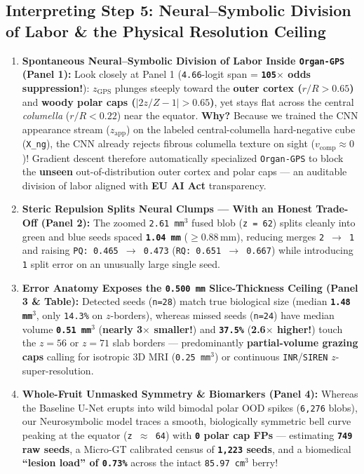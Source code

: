 \documentclass[10pt,a4paper]{article}
\begin{document}
\subsection*{Interpreting Step 5: Neural--Symbolic Division of Labor \& the Physical Resolution Ceiling}
\begin{enumerate}
    \item \textbf{Spontaneous Neural--Symbolic Division of Labor Inside \texttt{Organ-GPS} (Panel 1):} Look closely at Panel 1 (\texttt{4.66}-logit span = \textbf{\texttt{105$\times$} odds suppression!}): $z_{\text{GPS}}$ plunges steeply toward the \textbf{outer cortex ($r/R > 0.65$)} and \textbf{woody polar caps ($|2z/Z - 1| > 0.65$)}, yet stays flat across the central \textit{columella} ($r/R < 0.22$) near the equator. \textbf{Why?} Because we trained the CNN appearance stream ($z_{\text{app}}$) on the labeled central-columella hard-negative cube (\texttt{X\_ng}), the CNN already rejects fibrous columella texture on sight ($v_{\text{comp}} \approx 0$)! Gradient descent therefore automatically specialized \texttt{Organ-GPS} to block the \textbf{unseen} out-of-distribution outer cortex and polar caps --- an auditable division of labor aligned with \textbf{EU AI Act} transparency.
    \item \textbf{Steric Repulsion Splits Neural Clumps --- With an Honest Trade-Off (Panel 2):} The zoomed \texttt{2.61\,mm$^3$} fused blob (\texttt{z = 62}) splits cleanly into green and blue seeds spaced \textbf{\texttt{1.04\,mm}} ($\ge 0.88\,\text{mm}$), reducing merges \texttt{2 $\to$ 1} and raising \texttt{PQ: 0.465 $\to$ 0.473} (\texttt{RQ: 0.651 $\to$ 0.667}) while introducing \texttt{1} split error on an unusually large single seed.
    \item \textbf{Error Anatomy Exposes the \texttt{0.500\,mm} Slice-Thickness Ceiling (Panel 3 \& Table):} Detected seeds (\texttt{n=28}) match true biological size (median \textbf{\texttt{1.48\,mm$^3$}}, only \texttt{14.3\%} on $z$-borders), whereas missed seeds (\texttt{n=24}) have median volume \textbf{\texttt{0.51\,mm$^3$}} (\textbf{nearly 3$\times$ smaller!}) and \textbf{\texttt{37.5\%}} (\textbf{2.6$\times$ higher!}) touch the $z=56$ or $z=71$ slab borders --- predominantly \textbf{partial-volume grazing caps} calling for isotropic 3D MRI (\texttt{0.25\,mm$^3$}) or continuous \texttt{INR}/\texttt{SIREN} $z$-super-resolution.
    \item \textbf{Whole-Fruit Unmasked Symmetry \& Biomarkers (Panel 4):} Whereas the Baseline U-Net erupts into wild bimodal polar OOD spikes (\texttt{6,276} blobs), our Neurosymbolic model traces a smooth, biologically symmetric bell curve peaking at the equator (\texttt{z $\approx$ 64}) with \textbf{\texttt{0} polar cap FPs} --- estimating \textbf{\texttt{749} raw seeds}, a Micro-GT calibrated census of \textbf{\texttt{1,223} seeds}, and a biomedical \textbf{``lesion load'' of \texttt{0.73\%}} across the intact \texttt{85.97\,cm$^3$} berry!
\end{enumerate}
\end{document}
